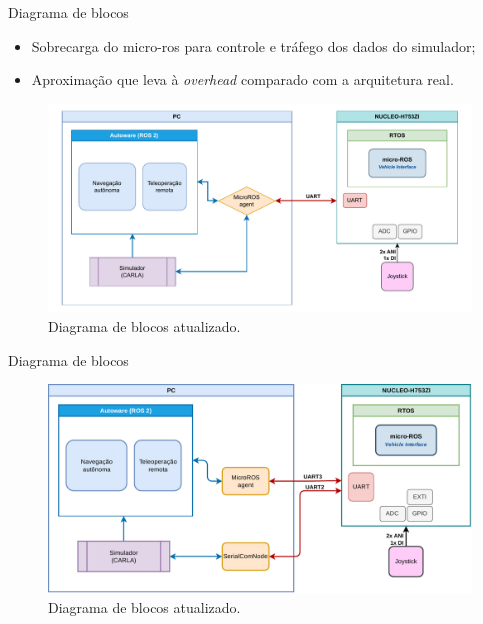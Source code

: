 \documentclass{if-beamer}
\begin{document}
\begin{frame}{Diagrama de blocos}
	
	\begin{block}{}
		
		\begin{itemize}
			\item Sobrecarga do micro-ros para controle e tráfego dos dados do simulador;
			\item Aproximação que leva à \textit{overhead} comparado com a arquitetura real.
			
		\end{itemize}
		
	\end{block}
	
	\begin{figure}[H]
		\centering
		\includegraphics[width=0.75\linewidth]{block_diagram_old}
		\caption{Diagrama de blocos atualizado.}
		\label{fig:block_diagram_old}
	\end{figure}
	
\end{frame}

\begin{frame}{Diagrama de blocos}
	
	\begin{figure}[H]
		\centering
		\includegraphics[width=0.95\linewidth]{block_diagram}
		\caption{Diagrama de blocos atualizado.}
		\label{fig:block_diagram}
	\end{figure}

\end{frame}
\end{document}
